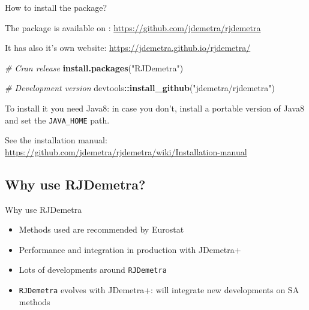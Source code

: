 \documentclass[10pt,xcolor=table,color={dvipsnames,usenames},ignorenonframetext,usepdftitle=false,french]{beamer}
\newenvironment{Shaded}{\begin{snugshade}}{\end{snugshade}}
\newcommand{\CommentTok}[1]{\textcolor[rgb]{0.56,0.35,0.01}{\textit{#1}}}
\newcommand{\KeywordTok}[1]{\textcolor[rgb]{0.13,0.29,0.53}{\textbf{#1}}}
\newcommand{\NormalTok}[1]{#1}
\newcommand{\OperatorTok}[1]{\textcolor[rgb]{0.81,0.36,0.00}{\textbf{#1}}}
\newcommand{\StringTok}[1]{\textcolor[rgb]{0.31,0.60,0.02}{#1}}
\begin{document}
\begin{frame}[fragile]{How to install the package?}
\protect\hypertarget{how-to-install-the-package-1}{}

The package is available on \large\faGithub\normalsize:
\url{https://github.com/jdemetra/rjdemetra}

It has also it's own website:
\url{https://jdemetra.github.io/rjdemetra/}

\begin{Shaded}
\begin{Highlighting}[]
\CommentTok{# Cran release}
\KeywordTok{install.packages}\NormalTok{(}\StringTok{"RJDemetra"}\NormalTok{)}

\CommentTok{# Development version}
\NormalTok{devtools}\OperatorTok{::}\KeywordTok{install_github}\NormalTok{(}\StringTok{"jdemetra/rjdemetra"}\NormalTok{)}
\end{Highlighting}
\end{Shaded}

\bcinfo To install it you need Java8: in case you don't, install a
portable version of Java8 and set the \texttt{JAVA\_HOME} path.

See the installation manual:
\url{https://github.com/jdemetra/rjdemetra/wiki/Installation-manual}

\end{frame}

\hypertarget{why-use-rjdemetra}{%
\subsection{Why use RJDemetra?}\label{why-use-rjdemetra}}

\begin{frame}[fragile]{Why use RJDemetra \bcquestion}
\protect\hypertarget{why-use-rjdemetra-1}{}

\begin{itemize}
\item
  Methods used are recommended by Eurostat
\item
  Performance and integration in production with JDemetra+
\item
  Lots of \large\faRProject{} \normalsize developments around
  \texttt{RJDemetra}
\item
  \texttt{RJDemetra} evolves with JDemetra+: will integrate new
  developments on SA methods
\end{itemize}

\end{frame}
\end{document}
